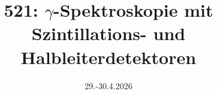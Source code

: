 
\usepackage[headsepline=true,markcase=upper]{scrlayer-scrpage}

\title{521: $\gamma$-Spektroskopie mit Szintillations- und Halbleiterdetektoren}

\date{29.-30.4.2026}





\maketitle

\tableofcontents























\printbibliography


